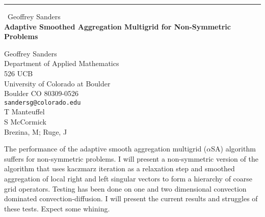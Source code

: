 \documentclass{report}
\begin{document}
\begin{center}
\rule{6in}{1pt} \
{\large Geoffrey Sanders \\
{\bf Adaptive Smoothed Aggregation Multigrid for Non-Symmetric Problems}}

Geoffrey Sanders \\ Department of Applied Mathematics \\ 526 UCB \\ University of Colorado at Boulder \\ Boulder CO 80309-0526
\\
{\tt sandersg@colorado.edu}\\
T Manteuffel\\
S McCormick\\
	Brezina, M; Ruge, J\end{center}

The performance of the adaptive smooth aggregation multigrid ($\alpha$SA)
algorithm suffers for non-symmetric problems. I will present a
non-symmetric version of the algorithm that uses kaczmarz iteration as a
relaxation step and smoothed aggregation of local right and left singular
vectors to form a hierarchy of coarse grid operators. Testing has been
done on one and two dimensional convection dominated
convection-diffusion. I will present the current results and struggles of
these tests. Expect some whining.
\end{document}
